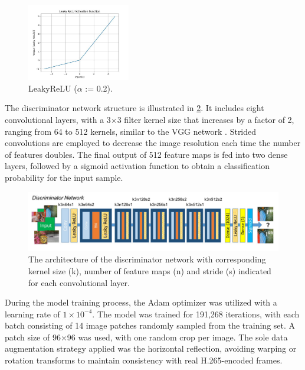 \begin{figure}
\centering
\includegraphics[width=0.4\textwidth]{static/LeakyReLU.jpg}
\caption{LeakyReLU ($\alpha$ := 0.2).}
\label{fig:leakyrelu}
\end{figure}

The discriminator network structure is illustrated in \cref{fig:discriminator}. It includes eight convolutional layers, with a 3$\times$3 filter kernel size that increases by a factor of 2, ranging from 64 to 512 kernels, similar to the VGG network \cite{simonyan2014very}. Strided convolutions are employed to decrease the image resolution each time the number of features doubles. The final output of 512 feature maps is fed into two dense layers, followed by a sigmoid activation function to obtain a classification probability for the input sample.

\begin{figure}[ht]
\centering
\includegraphics[width=1.0\textwidth]{static/discriminator_architecture.png}
\caption{The architecture of the discriminator network with corresponding kernel size (k), number of feature maps (n) and stride (s) indicated for each convolutional layer.}
\label{fig:discriminator}
\end{figure}

During the model training process, the Adam optimizer was utilized with a learning rate of $1\times10^{-4}$. The model was trained for 191,268 iterations, with each batch consisting of 14 image patches randomly sampled from the training set. A patch size of 96$\times$96 was used, with one random crop per image. The sole data augmentation strategy applied was the horizontal reflection, avoiding warping or rotation transforms to maintain consistency with real H.265-encoded frames.

